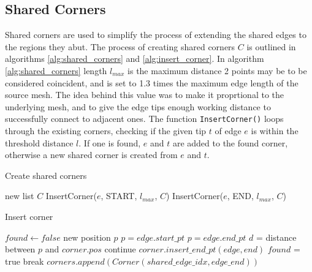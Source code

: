 \subsection{Shared Corners}
Shared corners are used to simplify the process of extending the shared edges to the regions they abut.
The process of creating shared corners $C$ is outlined in algorithms \ref{alg:shared_corners} and \ref{alg:insert_corner}.
In algorithm \ref{alg:shared_corners} length $l_{max}$ is the maximum distance 2 points may be to be considered coincident, and is set to 1.3 times the maximum edge length of the source mesh.
The idea behind this value was to make it proprtional to the underlying mesh, and to give the edge tips enough working distance to successfully connect to adjacent ones.
The function \texttt{InsertCorner()} loops through the existing corners, checking if the given tip $t$ of edge $e$ is within the threshold distance $l$.
If one is found, $e$ and $t$ are added to the found corner, otherwise a new shared corner is created from $e$ and $t$.
\begin{algorithm}[h]
	\caption{Create shared corners}\label{alg:shared_corners}
\begin{algorithmic}[1]
	\State new list $C$ 
		\State InsertCorner($e$, START, $l_{max}$, $C$)
		\State InsertCorner($e$, END, $l_{max}$, $C$)
	\EndFor
\end{algorithmic}
\end{algorithm}

\begin{algorithm}[h]
\caption{Insert corner}\label{alg:insert_corner}
\begin{algorithmic}[1]
		\State $found \leftarrow false$
		\State new position $p$
			\State $p = edge.start\_pt$
		\Else
			\State $p = edge.end\_pt$
		\EndIf
			\State $d$ = distance between $p$ and $corner.pos$
				\State continue
			\EndIf
			\State $corner.insert\_end\_pt(edge, end)$ 
			\State $found$ = true
			\State break
		\EndFor
		 
			\State $corners.append(Corner(shared\_edge\_idx, edge\_end))$
		\EndIf
	\EndFunction
\end{algorithmic}
\end{algorithm}

